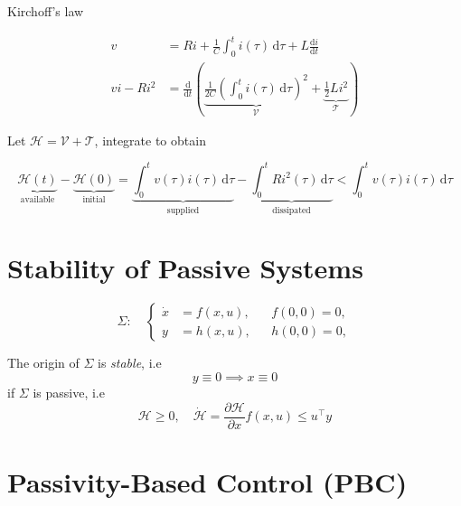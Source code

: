 \documentclass[
]{report}
\begin{document}
Kirchoff's law

\[
\begin{aligned}
v &= Ri + \frac{1}{C} \int_{0}^{t} i(\tau) \, \text{d}\tau + L \frac{\text{d} i}{\text{d} t} \\
vi - Ri^2 &= \frac{\text{d}}{\text{d} t} \left( 
  \underbrace{\frac{1}{2C} \left( \int_{0}^{t} i(\tau)\, \text{d} \tau \right)^2}_{\mathcal{V}} + 
  \underbrace{\frac{1}{2} Li^2}_{\mathcal{T}}  
\right)
\end{aligned}
\]

Let \(\mathcal{H} = \mathcal{V} + \mathcal{T}\), integrate to obtain

\[
\underbrace{\mathcal{H}(t)}_{\textrm{available}} -
\underbrace{\mathcal{H}(0)}_{\textrm{initial}} 
= 
\underbrace{\int_{0}^{t} v(\tau)i(\tau)\, \text{d} \tau}_{\textrm{supplied}} - 
\underbrace{\int_{0}^{t} Ri^2(\tau)\, \text{d} \tau}_{\textrm{dissipated}}
<
\int_{0}^{t} v(\tau) i(\tau) \, \text{d} \tau
\]

\hypertarget{stability-of-passive-systems}{%
\section{Stability of Passive
Systems}\label{stability-of-passive-systems}}

\[
\Sigma: \quad
\begin{cases}
  \dot{x} &= f(x,u), && f(0,0) = 0, \\
  y &= h(x,u), && h(0,0) = 0,
\end{cases}
\]

\begin{tcolorbox}[enhanced jigsaw, opacityback=0, breakable, leftrule=.75mm, toptitle=1mm, rightrule=.15mm, toprule=.15mm, bottomrule=.15mm, opacitybacktitle=0.6, colbacktitle=quarto-callout-note-color!10!white, colframe=quarto-callout-note-color-frame, title={Lemma (Khalil, 2002)}, bottomtitle=1mm, left=2mm, colback=white, arc=.35mm, titlerule=0mm, coltitle=black]
The origin of \(\Sigma\) is \emph{stable}, i.e \[
y \equiv 0 \implies x \equiv 0
\] if \(\Sigma\) is passive, i.e \[
\mathcal{H} \geq 0,\quad \dot{\mathcal{H}} = \frac{\partial\mathcal{H}}{\partial x} f(x,u) \leq u^{\top} y 
\]
\end{tcolorbox}

\hypertarget{passivity-based-control-pbc}{%
\section{Passivity-Based Control
(PBC)}\label{passivity-based-control-pbc}}
\end{document}
